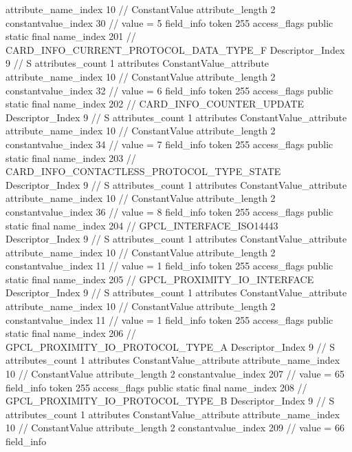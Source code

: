 {{{{{{{					attribute_name_index	10		// ConstantValue
					attribute_length	2
					constantvalue_index	30		// value = 5
				}
				}
			}
			field_info {
				token	255
				access_flags	public static final
				name_index	201		// CARD_INFO_CURRENT_PROTOCOL_DATA_TYPE_F
				Descriptor_Index	9		// S
				attributes_count	1
				attributes {
				ConstantValue_attribute {
					attribute_name_index	10		// ConstantValue
					attribute_length	2
					constantvalue_index	32		// value = 6
				}
				}
			}
			field_info {
				token	255
				access_flags	public static final
				name_index	202		// CARD_INFO_COUNTER_UPDATE
				Descriptor_Index	9		// S
				attributes_count	1
				attributes {
				ConstantValue_attribute {
					attribute_name_index	10		// ConstantValue
					attribute_length	2
					constantvalue_index	34		// value = 7
				}
				}
			}
			field_info {
				token	255
				access_flags	public static final
				name_index	203		// CARD_INFO_CONTACTLESS_PROTOCOL_TYPE_STATE
				Descriptor_Index	9		// S
				attributes_count	1
				attributes {
				ConstantValue_attribute {
					attribute_name_index	10		// ConstantValue
					attribute_length	2
					constantvalue_index	36		// value = 8
				}
				}
			}
			field_info {
				token	255
				access_flags	public static final
				name_index	204		// GPCL_INTERFACE_ISO14443
				Descriptor_Index	9		// S
				attributes_count	1
				attributes {
				ConstantValue_attribute {
					attribute_name_index	10		// ConstantValue
					attribute_length	2
					constantvalue_index	11		// value = 1
				}
				}
			}
			field_info {
				token	255
				access_flags	public static final
				name_index	205		// GPCL_PROXIMITY_IO_INTERFACE
				Descriptor_Index	9		// S
				attributes_count	1
				attributes {
				ConstantValue_attribute {
					attribute_name_index	10		// ConstantValue
					attribute_length	2
					constantvalue_index	11		// value = 1
				}
				}
			}
			field_info {
				token	255
				access_flags	public static final
				name_index	206		// GPCL_PROXIMITY_IO_PROTOCOL_TYPE_A
				Descriptor_Index	9		// S
				attributes_count	1
				attributes {
				ConstantValue_attribute {
					attribute_name_index	10		// ConstantValue
					attribute_length	2
					constantvalue_index	207		// value = 65
				}
				}
			}
			field_info {
				token	255
				access_flags	public static final
				name_index	208		// GPCL_PROXIMITY_IO_PROTOCOL_TYPE_B
				Descriptor_Index	9		// S
				attributes_count	1
				attributes {
				ConstantValue_attribute {
					attribute_name_index	10		// ConstantValue
					attribute_length	2
					constantvalue_index	209		// value = 66
				}
				}
			}
			field_info {
}}}}}
